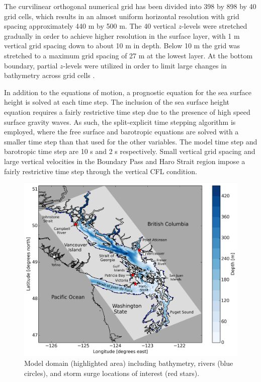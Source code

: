 \documentclass[pdftex,10pt]{article}
\begin{document}
The curvilinear orthogonal numerical grid has been divided into 398 by 898 by 40 grid cells, which results in an almost uniform horizontal resolution with grid spacing approximately 440 m by 500 m. The 40 vertical $z$-levels were stretched gradually in order to achieve higher resolution in the surface layer, with 1 m vertical grid spacing down to about 10 m in depth. Below 10 m the grid was stretched to a maximum grid spacing of 27 m at the lowest layer. At the bottom boundary, partial $z$-levels were utilized in order to limit large changes in bathymetry across grid cells \citep{madec2012nemo}. 

In addition to the equations of motion, a prognostic equation for the sea surface height is solved at each time step. The inclusion of the sea surface height equation requires a fairly restrictive time step due to the presence of high speed surface gravity waves. As such, the split-explicit time stepping algorithm is employed, where the free surface and barotropic equations are solved with a smaller time step than that used for the other variables. The model time step and barotropic time step are 10 s and 2 s respectively. Small vertical grid spacing and large vertical velocities in the Boundary Pass and Haro Strait region impose a fairly restrictive time step through the vertical CFL condition.


\begin{figure}[h]
\centering
\includegraphics[scale=0.5]{Figures/bathy.pdf}
\caption{Model domain (highlighted area) including bathymetry, rivers (blue circles), and storm surge locations of interest  (red stars).}\label{fig:domain}
\end{figure}
\end{document}
